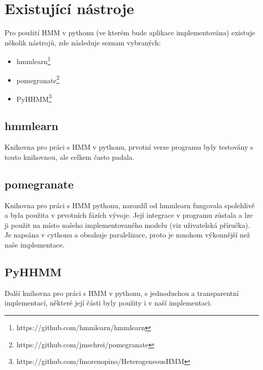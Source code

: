 \section{Existující nástroje}

Pro použití HMM v pythonu (ve kterém bude aplikace implementována) existuje několik nástrojů, zde následuje seznam vybraných:

\begin{itemize}
    \item hmmlearn\footnote{https://github.com/hmmlearn/hmmlearn}
    \item pomegranate\footnote{https://github.com/jmschrei/pomegranate}
    \item PyHHMM\footnote{https://github.com/fmorenopino/HeterogeneousHMM}
\end{itemize}

\subsection{hmmlearn}
Knihovna pro práci s HMM v pythonu, prvotní verze programu byly testovány s touto knihovnou, ale celkem často padala.

\subsection{pomegranate}
Knihovna pro práci s HMM pythonu, narozdíl od hmmlearn fungovala spolehlivě a byla použita v prvotních fázích vývoje. Její integrace v programu zůstala a lze ji použit na místo našeho implementovaného modelu (viz uživatelská příručka). Je napsána v cythonu a obsahuje paralelizace, proto je mnohom výkonnější než naše implementace.

\subsection{PyHHMM}
Další knihovna pro práci s HMM v pythonu, s jednoduchou a transparentní implementací, některé její části byly použity i v naší implementaci.


\clearpage
